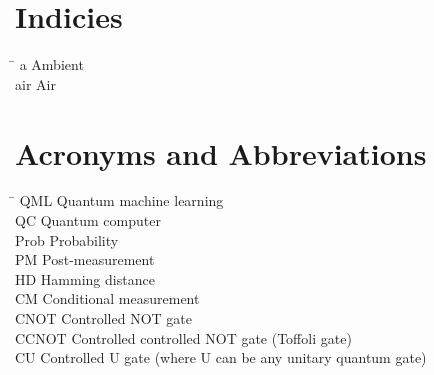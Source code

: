 \section*{Indicies}
\begin{tabbing}
 \hspace*{1.6cm}  \= \kill
 a \> Ambient \\[0.5ex]
 air \> Air
\end{tabbing}

\section*{Acronyms and Abbreviations}
\begin{tabbing}
 \hspace*{1.6cm}  \= \kill
 QML \> Quantum machine learning \\[0.5ex]
 QC \> Quantum computer \\[0.5ex]
 Prob \> Probability \\[0.5ex]
 PM \> Post-measurement \\[0.5ex]
 HD \> Hamming distance \\[0.5ex]
 CM \> Conditional measurement \\[0.5ex]
 CNOT \> Controlled NOT gate \\[0.5ex]
 CCNOT \> Controlled controlled NOT gate (Toffoli gate) \\[0.5ex]
 CU \> Controlled U gate (where U can be any unitary quantum gate) \\[0.5ex]
\end{tabbing}

 \cleardoublepage

